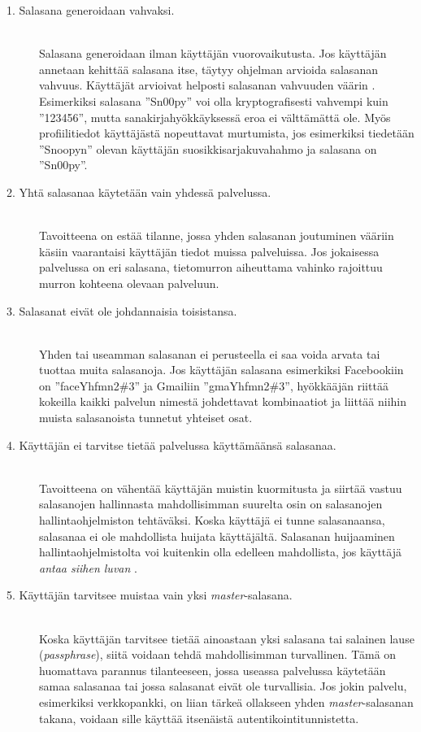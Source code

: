\documentclass{tktltiki}
\begin{document}
\begin{description}

  \item[1. Salasana generoidaan vahvaksi.] \hfill \\
    Salasana generoidaan ilman käyttäjän vuorovaikutusta. 
    Jos käyttäjän annetaan kehittää salasana itse, täytyy ohjelman arvioida salasanan vahvuus.
    Käyttäjät arvioivat helposti salasanan vahvuuden väärin \cite{password_management_strategies_06}. 
    Esimerkiksi salasana ''Sn00py'' voi olla kryptografisesti vahvempi kuin ''123456'', mutta
    sanakirjahyökkäyksessä eroa ei välttämättä ole. Myös profiilitiedot käyttäjästä nopeuttavat murtumista, jos 
    esimerkiksi tiedetään ''Snoopyn'' olevan käyttäjän suosikkisarjakuvahahmo ja salasana on ''Sn00py''.
     
  \item[2. Yhtä salasanaa käytetään vain yhdessä palvelussa.] \hfill \\
   Tavoitteena on estää tilanne, jossa yhden salasanan joutuminen vääriin käsiin vaarantaisi käyttäjän tiedot
   muissa palveluissa. Jos jokaisessa palvelussa on eri salasana, tietomurron aiheuttama vahinko rajoittuu
   murron kohteena olevaan palveluun.

  \item[3. Salasanat eivät ole johdannaisia toisistansa.] \hfill \\
    Yhden tai useamman salasanan ei perusteella ei saa voida arvata tai tuottaa muita salasanoja. Jos käyttäjän
    salasana esimerkiksi Facebookiin on ''faceYhfmn2\#3'' ja Gmailiin ''gmaYhfmn2\#3'', hyökkääjän riittää
    kokeilla kaikki palvelun nimestä johdettavat kombinaatiot ja liittää niihin muista salasanoista tunnetut
    yhteiset osat.

  \item[4. Käyttäjän ei tarvitse tietää palvelussa käyttämäänsä salasanaa.] \hfill \\
    Tavoitteena on vähentää käyttäjän muistin kuormitusta ja siirtää vastuu salasanojen hallinnasta
    mahdollisimman suurelta osin on salasanojen hallintaohjelmiston tehtäväksi.
    Koska käyttäjä ei tunne salasanaansa, salasanaa ei ole mahdollista huijata käyttäjältä.
    Salasanan huijaaminen hallintaohjelmistolta voi kuitenkin olla edelleen mahdollista, jos käyttäjä
    \emph{antaa siihen luvan} \cite{why_phishing_works_06}.

  \item[5. Käyttäjän tarvitsee muistaa vain yksi \emph{master}-salasana.] \hfill \\
    Koska käyttäjän tarvitsee tietää ainoastaan yksi salasana tai salainen lause (\emph{passphrase}), siitä
    voidaan tehdä mahdollisimman turvallinen. Tämä on huomattava parannus tilanteeseen, jossa useassa palvelussa
    käytetään samaa salasanaa tai jossa salasanat eivät ole turvallisia. Jos jokin palvelu, esimerkiksi
    verkkopankki, on liian tärkeä ollakseen yhden \emph{master}-salasanan takana, voidaan sille käyttää
    itsenäistä autentikointitunnistetta.

\end{description}
\end{document}
